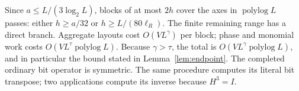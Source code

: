 Since $a\le L/(3\log_2 L)$, blocks of at most $2h$ cover the axes
in $\operatorname{polylog}L$ passes: either $h\ge a/32$ or
$h\ge L/(80\ell_R)$. The finite remaining range has a direct
branch. Aggregate layouts cost $O(VL^\gamma)$ per block; phase and
monomial work costs $O(VL^\tau\operatorname{polylog}L)$. Because
$\gamma>\tau$, the total is
$O(VL^\gamma\operatorname{polylog}L)$, and in particular the bound
stated in Lemma~\ref{lem:endpoint}. The completed ordinary bit
operator is symmetric. The same procedure computes its literal bit
transpose; two applications compute its inverse because $H^3=I$.
